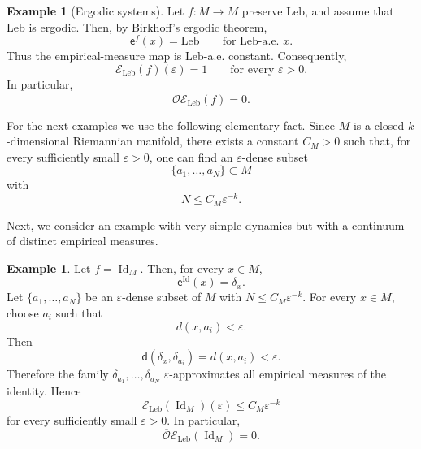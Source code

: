 \documentclass[11pt,reqno]{amsart}
\theoremstyle{plain}
\theoremstyle{definition}
\newtheorem{example}[theorem]{Example}
\theoremstyle{remark}
\theoremstyle{plain}
\numberwithin{equation}{section}
\newcommand{\Id}{\operatorname{Id}}
\begin{document}
\begin{example}[Ergodic systems]\label{ex:ergodic-systems}
Let $f:M\to M$ preserve $\mathrm{Leb}$, and assume that $\mathrm{Leb}$ is
ergodic. Then, by Birkhoff's ergodic theorem,
\begin{equation*}
\mathsf e^f(x)=\mathrm{Leb}
\qquad\text{for }\mathrm{Leb}\text{-a.e. }x.
\end{equation*}
Thus the empirical-measure map is $\mathrm{Leb}$-a.e. constant. Consequently,
\begin{equation*}
\mathcal E_{\mathrm{Leb}}(f)(\varepsilon)=1
\qquad\text{for every }\varepsilon>0.
\end{equation*}
In particular,
\begin{equation*}
\overline{\mathcal O}\mathcal E_{\mathrm{Leb}}(f)=0.
\end{equation*}
\end{example}

For the next examples we use the following elementary fact. Since $M$ is a
closed $k$-dimensional Riemannian manifold, there exists a constant
$C_M>0$ such that, for every sufficiently small $\varepsilon>0$, one can find
an $\varepsilon$-dense subset
\begin{equation*}
\{a_1,\dots,a_N\}\subset M
\end{equation*}
with
\begin{equation*}
N\leq C_M\varepsilon^{-k}.
\end{equation*}

Next, we consider an example with very simple dynamics but with a continuum of
distinct empirical measures.

\begin{example}\label{ex:identity-map}
Let $f=\Id_M$. Then, for every $x\in M$,
\begin{equation*}
\mathsf e^{\Id}(x)=\delta_x.
\end{equation*}
Let $\{a_1,\dots,a_N\}$ be an $\varepsilon$-dense subset of $M$ with
$N\leq C_M\varepsilon^{-k}$. For every $x\in M$, choose $a_i$ such that
\begin{equation*}
d(x,a_i)<\varepsilon.
\end{equation*}
Then
\begin{equation*}
\mathsf d(\delta_x,\delta_{a_i})=d(x,a_i)
<\varepsilon.
\end{equation*}
Therefore the family $\delta_{a_1},\dots,\delta_{a_N}$ $\varepsilon$-approximates
all empirical measures of the identity. Hence
\begin{equation*}
\mathcal E_{\mathrm{Leb}}(\Id_M)(\varepsilon)
\leq C_M\varepsilon^{-k}
\end{equation*}
for every sufficiently small $\varepsilon>0$. In particular,
\begin{equation*}
\overline{\mathcal O}\mathcal E_{\mathrm{Leb}}(\Id_M)=0.
\end{equation*}
\end{example}
\end{document}
